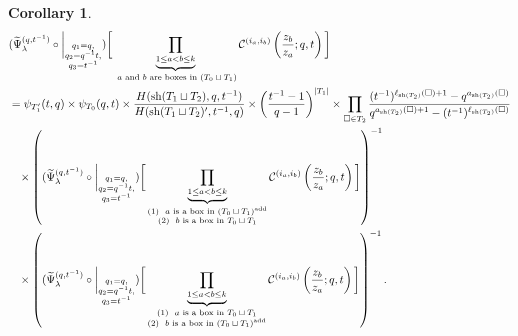 \documentclass[12pt,reqno,a4paper]{amsart}
\newcommand{\comp}{\circ}
\newcommand{\cals}[1]{\mathcal{#1}}
\numberwithin{equation}{section}
\newtheorem{cor}[thm]{Corollary}
\theoremstyle{definition}
\begin{document}
\begin{cor}\mbox{}
\label{coro312-1211-27jul}
\footnotesize
\begin{align}
	&(
	\widetilde{\Psi}_{\lambda}^{(q,t^{-1})}
	\comp 
	\bigg|_{
		\substack{
			q_1 = q, \\
			q_2 = q^{-1}t,\\
			q_3 = t^{-1} \\
		}
	}
	)
	\bigg[
	\underbrace{	\prod_{1 \leq a < b \leq k}				}_{\text{ $a$ and $b$ are boxes in $(T_0 \sqcup T_1)$}}
	\cals{C}^{(i_a,i_b)}\left(
	\frac{z_b}{z_a}
	; q, t
	\right)
	\bigg]
	\\
	&= 
	\psi_{T^{\prime}_{1}}(t,q) \times \psi_{T_0}(q,t)
	\times
	\frac{
		H(\operatorname{sh}(T_1 \sqcup T_2),q,t^{-1})
	}{
		H(\operatorname{sh}(T_1 \sqcup T_2)^\prime,t^{-1},q)
	}
	\times
	\left(	\frac{t^{-1} - 1}{q-1}		\right)^{|T_1|}
	\notag 
	\times 
	\prod_{\square \in T_2}
	\frac{
		(t^{-1})^{\ell_{\operatorname{sh}(T_2)}(\square) + 1} - q^{a_{\operatorname{sh}(T_2)}(\square)}
	}{
		q^{a_{\operatorname{sh}(T_2)}(\square) + 1} - (t^{-1})^{\ell_{\operatorname{sh}(T_2)}(\square)}
	}
	\notag 
	\\
	&\hspace{0.3cm}\times
	\left(
	(
	\widetilde{\Psi}_{\lambda}^{(q,t^{-1})}
	\comp 
	\bigg|_{
		\substack{
			q_1 = q, \\
			q_2 = q^{-1}t,\\
			q_3 = t^{-1} \\
		}
	}
	)
	\bigg[
	\underbrace{	\prod_{1 \leq a < b \leq k}				}_{
		\substack{
			(1) \,\, \text{ $a$ is a box in $(T_0 \sqcup T_1)^{\operatorname{add}}$}
			\\
			(2) \,\, \text{ $b$ is a box in $T_0 \sqcup T_1$}
		}
	}
	\cals{C}^{(i_a,i_b)}\left(
	\frac{z_b}{z_a}
	; q, t
	\right)
	\bigg]
	\right)^{-1}
	\notag 
	\\
	&\hspace{0.3cm}\times
	\left(
	(
	\widetilde{\Psi}_{\lambda}^{(q,t^{-1})}
	\comp 
	\bigg|_{
		\substack{
			q_1 = q, \\
			q_2 = q^{-1}t,\\
			q_3 = t^{-1} \\
		}
	}
	)
	\bigg[
	\underbrace{	\prod_{1 \leq a < b \leq k}				}_{
		\substack{
			(1) \,\, \text{ $a$ is a box in $T_0 \sqcup T_1$}
			\\
			(2) \,\, \text{ $b$ is a box in $(T_0 \sqcup T_1)^{\operatorname{add}}$}
		}
	}
	\cals{C}^{(i_a,i_b)}\left(
	\frac{z_b}{z_a}
	; q, t
	\right)
	\bigg]
	\right)^{-1}.
	\notag
\end{align}
\normalsize
\end{cor}
\end{document}
